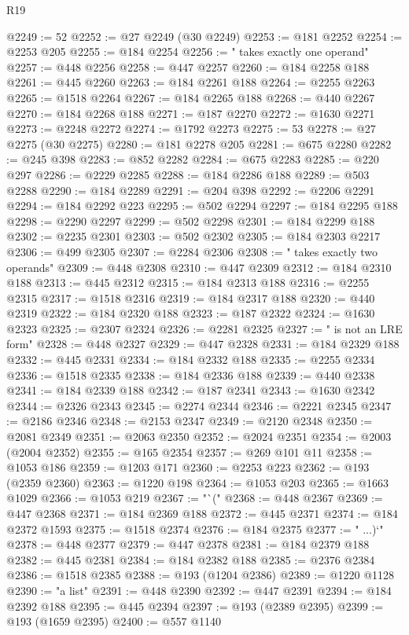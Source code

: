\begin{lexlean}{R19}
\begin{coremodule}
@2249 := 52
@2252 := @27 @2249 (@30 @2249)
@2253 := @181 @2252
@2254 := @2253 @205
@2255 := @184 @2254
@2256 := " takes exactly one operand"
@2257 := @448 @2256
@2258 := @447 @2257
@2260 := @184 @2258 @188
@2261 := @445 @2260
@2263 := @184 @2261 @188
@2264 := @2255 @2263
@2265 := @1518 @2264
@2267 := @184 @2265 @188
@2268 := @440 @2267
@2270 := @184 @2268 @188
@2271 := @187 @2270
@2272 := @1630 @2271
@2273 := @2248 @2272
@2274 := @1792 @2273
@2275 := 53
@2278 := @27 @2275 (@30 @2275)
@2280 := @181 @2278 @205
@2281 := @675 @2280
@2282 := @245 @398
@2283 := @852 @2282
@2284 := @675 @2283
@2285 := @220 @297
@2286 := @2229 @2285
@2288 := @184 @2286 @188
@2289 := @503 @2288
@2290 := @184 @2289
@2291 := @204 @398
@2292 := @2206 @2291
@2294 := @184 @2292 @223
@2295 := @502 @2294
@2297 := @184 @2295 @188
@2298 := @2290 @2297
@2299 := @502 @2298
@2301 := @184 @2299 @188
@2302 := @2235 @2301
@2303 := @502 @2302
@2305 := @184 @2303 @2217
@2306 := @499 @2305
@2307 := @2284 @2306
@2308 := " takes exactly two operands"
@2309 := @448 @2308
@2310 := @447 @2309
@2312 := @184 @2310 @188
@2313 := @445 @2312
@2315 := @184 @2313 @188
@2316 := @2255 @2315
@2317 := @1518 @2316
@2319 := @184 @2317 @188
@2320 := @440 @2319
@2322 := @184 @2320 @188
@2323 := @187 @2322
@2324 := @1630 @2323
@2325 := @2307 @2324
@2326 := @2281 @2325
@2327 := " is not an LRE form"
@2328 := @448 @2327
@2329 := @447 @2328
@2331 := @184 @2329 @188
@2332 := @445 @2331
@2334 := @184 @2332 @188
@2335 := @2255 @2334
@2336 := @1518 @2335
@2338 := @184 @2336 @188
@2339 := @440 @2338
@2341 := @184 @2339 @188
@2342 := @187 @2341
@2343 := @1630 @2342
@2344 := @2326 @2343
@2345 := @2274 @2344
@2346 := @2221 @2345
@2347 := @2186 @2346
@2348 := @2153 @2347
@2349 := @2120 @2348
@2350 := @2081 @2349
@2351 := @2063 @2350
@2352 := @2024 @2351
@2354 := @2003 (@2004 @2352)
@2355 := @165 @2354
@2357 := @269 @101 @11
@2358 := @1053 @186
@2359 := @1203 @171
@2360 := @2253 @223
@2362 := @193 (@2359 @2360)
@2363 := @1220 @198
@2364 := @1053 @203
@2365 := @1663 @1029
@2366 := @1053 @219
@2367 := "`("
@2368 := @448 @2367
@2369 := @447 @2368
@2371 := @184 @2369 @188
@2372 := @445 @2371
@2374 := @184 @2372 @1593
@2375 := @1518 @2374
@2376 := @184 @2375
@2377 := " ...)`"
@2378 := @448 @2377
@2379 := @447 @2378
@2381 := @184 @2379 @188
@2382 := @445 @2381
@2384 := @184 @2382 @188
@2385 := @2376 @2384
@2386 := @1518 @2385
@2388 := @193 (@1204 @2386)
@2389 := @1220 @1128
@2390 := "a list"
@2391 := @448 @2390
@2392 := @447 @2391
@2394 := @184 @2392 @188
@2395 := @445 @2394
@2397 := @193 (@2389 @2395)
@2399 := @193 (@1659 @2395)
@2400 := @557 @1140

\end{coremodule}
\end{lexlean}
